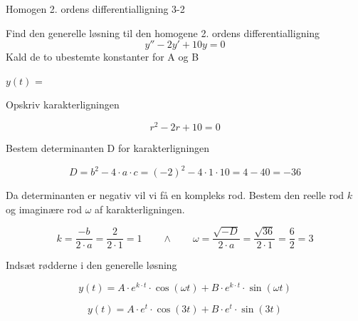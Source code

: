 \documentclass{article}
\begin{document}
\begin{exercise}{Homogen 2. ordens differentialligning 3-2}

Find den generelle løsning til den homogene 2. ordens differentialligning
\[
y'' - 2y' + 10y = 0
\]
Kald de to ubestemte konstanter for A og B

$y(t)$ = 


\hint

Opskriv karakterligningen

\hint

\[
r^2 - 2r + 10 = 0
\]


\hint

Bestem determinanten D for karakterligningen


\hint
\[
D = b^2 - 4 \cdot a \cdot c = (-2)^2 - 4 \cdot 1 \cdot 10 = 4 - 40 = -36
\]

\hint
Da determinanten er negativ vil vi få en kompleks rod. Bestem den reelle rod $k$ og imaginære rod $\omega$ af karakterligningen.


\hint

\[
k = \frac{-b}{2 \cdot a} = \frac{2}{2 \cdot 1} = 1 \qquad \wedge \qquad \omega = \frac{\sqrt{-D}}{2 \cdot a} = \frac{\sqrt{36}}{2 \cdot 1} = \frac{6}{2} = 3
\]

\hint

Indsæt rødderne i den generelle løsning

\hint
\[
y(t) = A \cdot e^{k \cdot t} \cdot \cos(\omega t)+ B \cdot e^{k \cdot t} \cdot \sin(\omega t)
\]

\hint

\[
y(t) = A \cdot e^{t} \cdot \cos(3 t)+ B \cdot e^{ t} \cdot \sin(3t)
\]

\end{exercise}

\newpage
\end{document}
